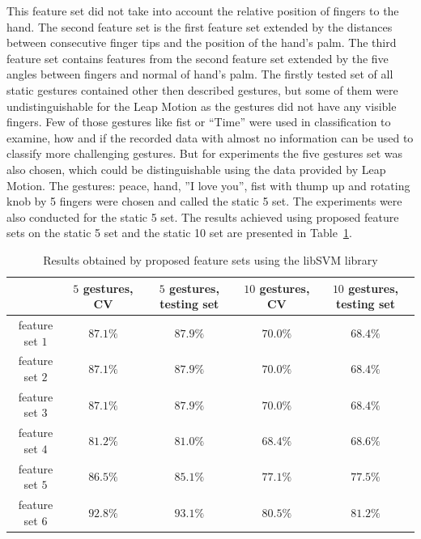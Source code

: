 This feature set did not take into account the relative position of fingers to the hand.
The second feature set is the first feature set extended by the distances between consecutive finger tips and the position of the hand's palm.
The third feature set contains features from the second feature set extended by the five angles between fingers and normal of hand's palm.
The firstly tested set of all static gestures contained other then described gestures, but some of them were undistinguishable for the Leap Motion as the gestures did not have any visible fingers.
Few of those gestures like fist or ``Time'' were used in classification to examine, how and if the recorded data with almost no information can be used to classify more challenging gestures.
But for experiments the five gestures set was also chosen, which could be distinguishable using the data provided by Leap Motion. 
The gestures: peace, hand, ''I love you'', fist with thump up and rotating knob by 5 fingers were chosen and called the static 5 set.
The experiments were also conducted for the static 5 set.
The results achieved using proposed feature sets on the static 5 set and the static 10 set are presented in Table~\ref{staticfeat}.

\begin{table}[htp!]
	\label{staticfeat}
	\caption{Results obtained by proposed feature sets using the libSVM library}
    \begin{tabular}{ccccc}
    \hline
    ~                                                   & $5$ gestures, CV & $5$ gestures, testing set & $10$ gestures, CV  & $10$ gestures, testing set \\ \hline \hline
    feature set $1$                     & $87.1\%$ & $87.9\%$ & $70.0\%$ & $68.4\%$   \\ \hline
    feature set $2$                     & $87.1\%$ & $87.9\%$ & $70.0\%$ & $68.4\%$          \\ \hline
    feature set $3$                     & $87.1\%$ & $87.9\%$ & $70.0\%$ & $68.4\%$           \\ \hline
    feature set $4$                     & $81.2\%$ & $81.0\%$ & $68.4\%$ & $68.6\%$          \\ \hline
    feature set $5$                     & $86.5\%$ & $85.1\%$ & $77.1\%$ & $77.5\%$          \\ \hline
    feature set $6$                     & $92.8\%$ & $93.1\%$ & $80.5\%$ & $81.2\%$           \\ \hline
    \end{tabular}
\end{table}

